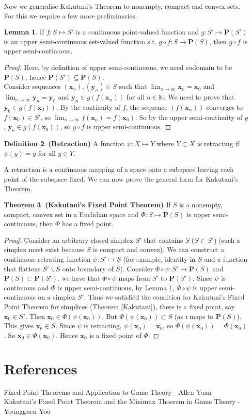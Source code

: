 \documentclass{article}
\theoremstyle{definition}
\newtheorem{theorem}{Theorem}[section]
\newtheorem{lem}[theorem]{Lemma}
\newtheorem{defn}[theorem]{Definition}
\begin{document}
Now we generalise Kakutani's Theorem to nonempty, compact and convex sets. For this we require a few more preliminaries.
\begin{lem}
\label{Composite}
If $f:S\mapsto S'$ is a continuous point-valued function and $g:S'\mapsto \mathbf{P}(S')$ is an upper semi-continuous set-valued function s.t. $g\circ f : S\mapsto \mathbf{P}(S)$, then $g\circ f$ is upper semi-continuous.
\end{lem}
\begin{proof}
Here, by definition of upper semi-continuous, we need codomain to be $\mathbf{P}(S)$, hence $\mathbf{P}(S')\subseteq \mathbf{P}(S)$.\\
Consider sequences $(\mathbf{x}_n),(\mathbf{y}_n) \in S$ such that $\lim_{n\to\infty}\mathbf{x}_n = \mathbf{x}_0$ and $\lim_{n\to\infty}\mathbf{y}_n = \mathbf{y}_0$ and $\mathbf{y}_n\in g(f(\mathbf{x}_n))$ for all $n\in \mathbb{N}$. We need to prove that $\mathbf{y}_0\in g(f(\mathbf{x}_0))$. By the continuity of $f$, the sequence $(f(\mathbf{x}_n))$ converges to $f(\mathbf{x}_0) \in S'$, so $\lim_{n\to\infty}f(\mathbf{x}_n) = f(\mathbf{x}_0)$. So by the upper semi-continuity of $g$, $\mathbf{y}_0 \in g(f(\mathbf{x}_0))$, so  $g\circ f$ is upper semi-continuous. 
\end{proof}
\begin{defn}
\textbf{(Retraction)} A function $\psi: X\mapsto Y$ where $Y\subset X$ is retracting if $\psi(y) = y$ for all $y\in Y$.
\end{defn}
A retraction is a continuous mapping of a space onto a subspace leaving each point of the subspace fixed. We can now prove the general form for Kakutani's Theorem.
\begin{theorem}
\textbf{(Kakutani's Fixed Point Theorem)} If $S$ is a nonempty, compact, convex set in a Euclidian space and $\Phi: S\mapsto\mathbf{P}(S)$ is upper semi-continuous, then $\Phi$ has a fixed point.
\end{theorem}
\begin{proof}
Consider an arbitrary closed simplex $S'$ that contains $S$ ($S\subset S'$) (such a simplex must exist because $S$ is compact and convex). We can construct a continuous retrating function $\psi:S'\mapsto S$ (for example, identity in $S$ and a function that flattens $S'\backslash S$ onto boundary of $S$). Consider $\Phi\circ\psi :S'\mapsto \mathbf{P}(S)$ and $\mathbf{P}(S) \subset \mathbf{P}(S')$, we have that $\Phi\circ\psi$ maps from $S'$ to $\mathbf{P}(S')$. Since $\psi$ is continuous and $\Phi$ is upper semi-continuous, by Lemma \ref{Composite}, $\Phi\circ\psi$ is upper semi-continuous on a simplex $S'$. Thus we satisfied the condition for Kakutani's Fixed Point Theorem for simplices (Theorem \ref{Kakutani}), there is a fixed point, say $\mathbf{x}_0\in S'$. Then $\mathbf{x}_0\in \Phi(\psi(\mathbf{x}_0))$. But $\Phi(\psi(\mathbf{x}_0)) \subset S$  (as i maps to $\mathbf{P}(S)$). This gives $\mathbf{x}_0 \in S$. Since $\psi$ is retracting, $\psi(\mathbf{x}_0) = \mathbf{x}_0$, so $\Phi(\psi(\mathbf{x}_0)) = \Phi(\mathbf{x}_0)$. So $\mathbf{x}_0 \in \Phi(\mathbf{x}_0)$. Hence $\mathbf{x}_0$ is a fixed point of $\Phi$.
\end{proof}
\section*{References}
Fixed Point Theorems and Application to Game Theory - Allen Yuan\\
Kakutani's Fixed Point Theorem and the Minimax Thoerem in Game Theory - Youngguen Yoo 
\end{document}

